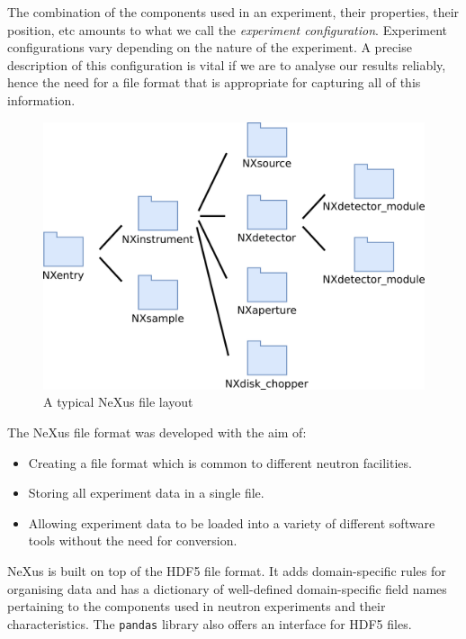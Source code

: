 The combination of the components used in an experiment, their properties, their position, etc amounts to what we call the \textit{experiment configuration}. Experiment configurations vary depending on the nature of the experiment. A precise description of this configuration is vital if we are to analyse our results reliably, hence the need for a file format that is appropriate for capturing all of this information.

\begin{figure}
\begin{center}
\includegraphics[width=0.8\linewidth]{instrument_arch.png}
\end{center}
\caption{A typical NeXus file layout}
\vspace{-50pt}
\end{figure}

The NeXus file format was developed with the aim of:
\begin{itemize}
\item Creating a file format which is common to different neutron facilities.
\item Storing all experiment data in a single file.
\item Allowing experiment data to be loaded into a variety of different software tools without the need for conversion.
\end{itemize}
\smallskip
NeXus is built on top of the HDF5 file format. It adds domain-specific rules for organising data and has a dictionary of well-defined domain-specific field names pertaining to the components used in neutron experiments and their characteristics. The \texttt{pandas} library also offers an interface for HDF5 files.
